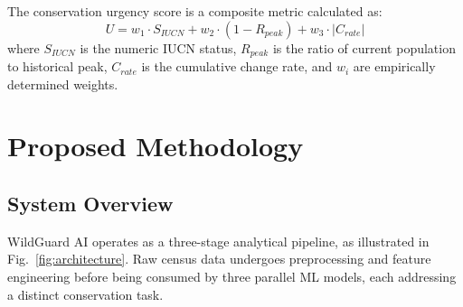 \documentclass[conference]{IEEEtran}
\begin{document}
The conservation urgency score is a composite metric calculated as:
\begin{equation}
U = w_1 \cdot S_{IUCN} + w_2 \cdot (1 - R_{peak}) + w_3 \cdot |C_{rate}|
\label{eq:urgency}
\end{equation}
where $S_{IUCN}$ is the numeric IUCN status, $R_{peak}$ is the ratio of current population to historical peak, $C_{rate}$ is the cumulative change rate, and $w_i$ are empirically determined weights.

\section{Proposed Methodology}

\subsection{System Overview}
WildGuard AI operates as a three-stage analytical pipeline, as illustrated in Fig.~\ref{fig:architecture}. Raw census data undergoes preprocessing and feature engineering before being consumed by three parallel ML models, each addressing a distinct conservation task.
\end{document}
